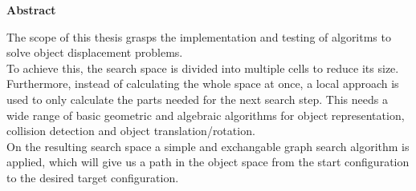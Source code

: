 




\pagestyle{headings}


\centerline{\bf Abstract}



%
\vskip 2cm
%


The scope of this thesis grasps the implementation and testing of algoritms to solve object displacement problems.\\
To achieve this, the search space is divided into multiple cells to reduce its size. Furthermore, instead of calculating the whole space at once, a local approach is used to only calculate the parts needed for the next search step. This needs a wide range of basic geometric and algebraic algorithms for object representation, collision detection and object translation/rotation.\\
On the resulting search space a simple and exchangable graph search algorithm is applied, which will give us a path in the object space from the
start configuration to the desired target configuration.

%
%
%
%
%
